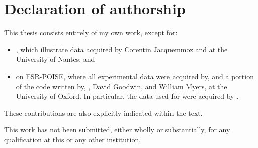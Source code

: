 \chapter{Declaration of authorship}

This thesis consists entirely of my own work, except for:

\begin{itemize}
    \item {}, which illustrate data acquired by Corentin Jacquemmoz and \JND{} at the University of Nantes; and
    \item {} on ESR-POISE, where all experimental data were acquired by, and a portion of the code written by, \JBV{}, David Goodwin, and William Myers, at the University of Oxford.
        In particular, the data used for  were acquired by \JBV{}.
\end{itemize}

These contributions are also explicitly indicated within the text.

This work has not been submitted, either wholly or substantially, for any qualification at this or any other institution.
